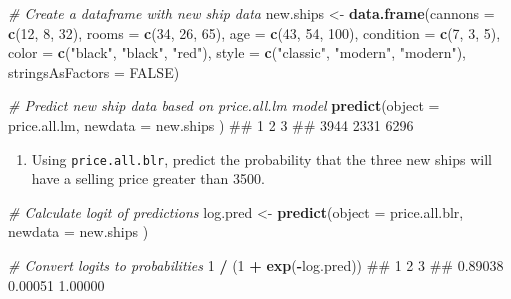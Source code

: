 \documentclass[]{book}
\newenvironment{Shaded}{\begin{snugshade}}{\end{snugshade}}
\newcommand{\KeywordTok}[1]{\textcolor[rgb]{0.13,0.29,0.53}{\textbf{#1}}}
\newcommand{\DataTypeTok}[1]{\textcolor[rgb]{0.13,0.29,0.53}{#1}}
\newcommand{\DecValTok}[1]{\textcolor[rgb]{0.00,0.00,0.81}{#1}}
\newcommand{\StringTok}[1]{\textcolor[rgb]{0.31,0.60,0.02}{#1}}
\newcommand{\CommentTok}[1]{\textcolor[rgb]{0.56,0.35,0.01}{\textit{#1}}}
\newcommand{\OtherTok}[1]{\textcolor[rgb]{0.56,0.35,0.01}{#1}}
\newcommand{\OperatorTok}[1]{\textcolor[rgb]{0.81,0.36,0.00}{\textbf{#1}}}
\newcommand{\NormalTok}[1]{#1}
\providecommand{\tightlist}{%
  \setlength{\itemsep}{0pt}\setlength{\parskip}{0pt}}
\theoremstyle{definition}
\theoremstyle{definition}
\theoremstyle{remark}
\begin{document}
\begin{Shaded}
\begin{Highlighting}[]
\CommentTok{# Create a dataframe with new ship data}
\NormalTok{new.ships <-}\StringTok{ }\KeywordTok{data.frame}\NormalTok{(}\DataTypeTok{cannons =} \KeywordTok{c}\NormalTok{(}\DecValTok{12}\NormalTok{, }\DecValTok{8}\NormalTok{, }\DecValTok{32}\NormalTok{),}
                  \DataTypeTok{rooms =} \KeywordTok{c}\NormalTok{(}\DecValTok{34}\NormalTok{, }\DecValTok{26}\NormalTok{, }\DecValTok{65}\NormalTok{),}
                  \DataTypeTok{age =} \KeywordTok{c}\NormalTok{(}\DecValTok{43}\NormalTok{, }\DecValTok{54}\NormalTok{, }\DecValTok{100}\NormalTok{),}
                  \DataTypeTok{condition =} \KeywordTok{c}\NormalTok{(}\DecValTok{7}\NormalTok{, }\DecValTok{3}\NormalTok{, }\DecValTok{5}\NormalTok{),}
                  \DataTypeTok{color =} \KeywordTok{c}\NormalTok{(}\StringTok{"black"}\NormalTok{, }\StringTok{"black"}\NormalTok{, }\StringTok{"red"}\NormalTok{),}
                  \DataTypeTok{style =} \KeywordTok{c}\NormalTok{(}\StringTok{"classic"}\NormalTok{, }\StringTok{"modern"}\NormalTok{, }\StringTok{"modern"}\NormalTok{),}
                  \DataTypeTok{stringsAsFactors =} \OtherTok{FALSE}\NormalTok{)}

\CommentTok{# Predict new ship data based on price.all.lm model}
\KeywordTok{predict}\NormalTok{(}\DataTypeTok{object =}\NormalTok{ price.all.lm,}
        \DataTypeTok{newdata =}\NormalTok{ new.ships}
\NormalTok{        )}
\NormalTok{##    1    2    3 }
\NormalTok{## 3944 2331 6296}
\end{Highlighting}
\end{Shaded}

\begin{enumerate}
\def\labelenumi{\arabic{enumi}.}
\setcounter{enumi}{7}
\tightlist
\item
  Using \texttt{price.all.blr}, predict the probability that the three
  new ships will have a selling price greater than 3500.
\end{enumerate}

\begin{Shaded}
\begin{Highlighting}[]
\CommentTok{# Calculate logit of predictions}
\NormalTok{log.pred <-}\StringTok{ }\KeywordTok{predict}\NormalTok{(}\DataTypeTok{object =}\NormalTok{ price.all.blr,}
                    \DataTypeTok{newdata =}\NormalTok{ new.ships}
\NormalTok{                    )}

\CommentTok{# Convert logits to probabilities}
\DecValTok{1} \OperatorTok{/}\StringTok{ }\NormalTok{(}\DecValTok{1} \OperatorTok{+}\StringTok{ }\KeywordTok{exp}\NormalTok{(}\OperatorTok{-}\NormalTok{log.pred))}
\NormalTok{##       1       2       3 }
\NormalTok{## 0.89038 0.00051 1.00000}
\end{Highlighting}
\end{Shaded}


\end{document}
